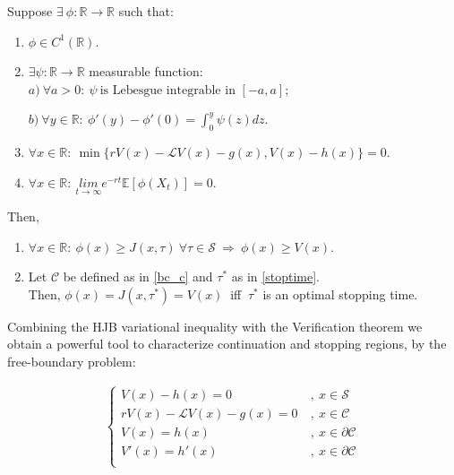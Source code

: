 \begin{theo}
	\label{verif}
	Suppose $\exists \ \phi: \mathds{R}\rightarrow \mathds{R}$ such that:
	\begin{enumerate}
		\item $\phi \in C^1(\mathds{R})$.
		\item $\exists \psi:\mathds{R}\rightarrow \mathds{R}$ measurable function: $a) \ \forall a>0: \ \psi \ \text{is Lebesgue integrable in } [-a,a]$;
		
		\hspace{5.2cm} $b) \ \forall y \in \mathds{R}: \ \phi'(y)-\phi'(0)=\int^y_0 \psi(z)dz$.
		\item $\forall x \in \mathds{R}: \ \min \{ r V(x)-\mathcal{L}V(x)-g(x), V(x)-h(x) \}=0$.
		\item $\forall x\in \mathds{R}: \ \underset{t\to \infty}{lim} e^{-rt}\mathds{E}[\phi(X_t)]=0$.
	\end{enumerate}
Then,
\begin{enumerate}
	\item  $\forall x \in \mathds{R}: \ \phi(x) \geq J(x,\tau) \ \forall \tau \in \mathcal{S} \ \Rightarrow \ \phi(x) \geq V(x)$.
	\item Let $\mathcal{C}$ be defined as in \eqref{bc_c} and $\tau^*$ as in \eqref{stoptime}.\\
	Then, $\phi(x)=J(x,\tau^*)=V(x) \ $ iff $\ \tau^*$ is an optimal stopping time.
\end{enumerate}
\end{theo}

Combining the HJB variational inequality with the Verification theorem we obtain a powerful tool to characterize continuation and stopping regions, by the free-boundary problem: 

\begin{align}
\begin{cases}
V(x)-h(x)=0 \ &, \ x \in \mathcal{S} \\
r V(x)-\mathcal{L}V(x)-g(x)=0  \ &, \ x \in \mathcal{C} \\
V(x)=h(x) \ &, \ x \in  \partial \mathcal{C} \\
V'(x)=h'(x) \ &, \ x \in  \partial \mathcal{C} \\
\end{cases}
\label{bc_prob}
\end{align}

